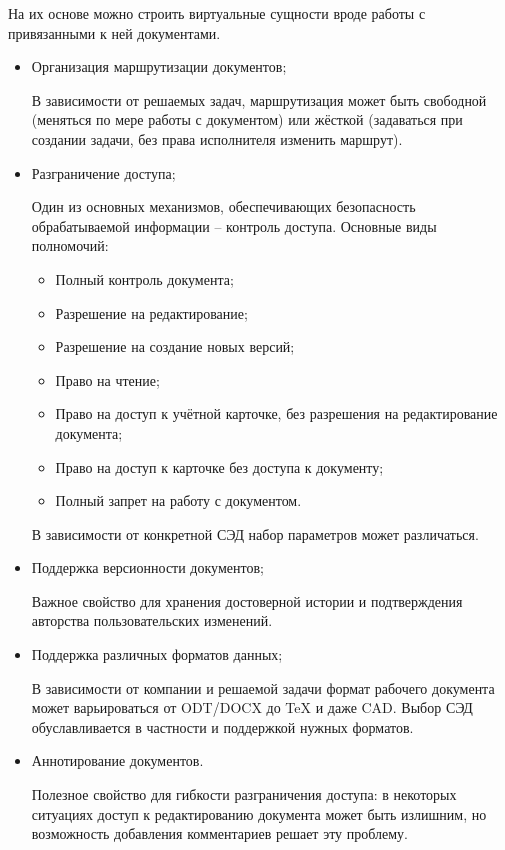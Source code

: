 На их основе можно строить виртуальные сущности вроде работы с привязанными к ней документами.
\begin{itemize}
	\item Организация маршрутизации документов;

	В зависимости от решаемых задач, маршрутизация может быть свободной (меняться по мере работы с документом) или жёсткой (задаваться при создании задачи, без права исполнителя изменить маршрут).
	\item Разграничение доступа;

	Один из основных механизмов, обеспечивающих безопасность обрабатываемой информации – контроль доступа. Основные виды полномочий:
	\begin{itemize}
		\item Полный контроль документа;
		\item Разрешение на редактирование;
		\item Разрешение на создание новых версий;
		\item Право на чтение;
		\item Право на доступ к учётной карточке, без разрешения на редактирование документа;
		\item Право на доступ к карточке без доступа к документу;
		\item Полный запрет на работу с документом.
	\end{itemize}
	В зависимости от конкретной СЭД набор параметров может различаться.
	\item Поддержка версионности документов;

	Важное свойство для хранения достоверной истории и подтверждения авторства пользовательских изменений.
	\item Поддержка различных форматов данных;

	В зависимости от компании и решаемой задачи формат рабочего документа может варьироваться от ODT/DOCX до TeX и даже CAD. Выбор СЭД обуславливается в частности и поддержкой нужных форматов.
	\item Аннотирование документов.

	Полезное свойство для гибкости разграничения доступа: в некоторых ситуациях доступ к редактированию документа может быть излишним, но возможность добавления комментариев решает эту проблему.
\end{itemize}